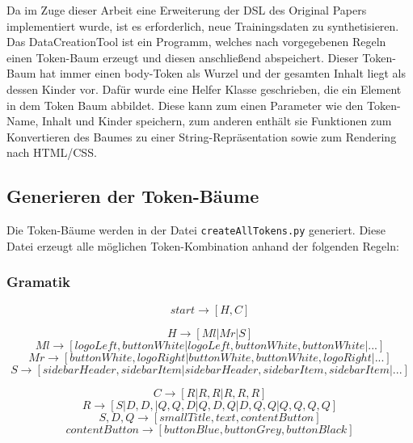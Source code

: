 \documentclass[pdftex,a4paper,halfparskip]{scrartcl}
\begin{document}
Da im Zuge dieser Arbeit eine Erweiterung der DSL des Original Papers implementiert wurde, ist es erforderlich, neue Trainingsdaten zu synthetisieren. Das DataCreationTool ist ein Programm, welches nach vorgegebenen Regeln einen Token-Baum erzeugt und diesen anschließend abspeichert. Dieser Token-Baum hat immer einen body-Token als Wurzel und der gesamten Inhalt liegt als dessen Kinder vor. Dafür wurde eine Helfer Klasse geschrieben, die ein Element in dem Token Baum abbildet. Diese kann zum einen Parameter wie den Token-Name, Inhalt und Kinder speichern, zum anderen enthält sie Funktionen zum Konvertieren des Baumes zu einer String-Repräsentation sowie zum Rendering nach HTML/CSS. 

\subsection{Generieren der Token-Bäume}
Die Token-Bäume werden in der Datei \texttt{createAllTokens.py} generiert. Diese Datei erzeugt alle möglichen Token-Kombination anhand der folgenden Regeln:

\subsubsection{Gramatik}

\begin{equation}
start \rightarrow [H,C]
\end{equation}

\begin{equation}
H \rightarrow [Ml | Mr | S]
\end{equation}
\begin{equation}
Ml \rightarrow  [ logoLeft, buttonWhite | logoLeft, buttonWhite, buttonWhite | ...]
\end{equation}
\begin{equation}
Mr \rightarrow [buttonWhite, logoRight | buttonWhite, buttonWhite, logoRight | ...]
\end{equation}
\begin{equation}
S \rightarrow [sidebarHeader, sidebarItem| sidebarHeader, sidebarItem, sidebarItem | ...]
\end{equation}

\begin{equation}
C \rightarrow [R | R, R | R, R, R ]
\end{equation}
\begin{equation}
R \rightarrow [S | D, D, | Q, Q, D | Q, D, Q | D, Q, Q | Q, Q, Q, Q]
\end{equation}
\begin{equation}
S, D, Q \rightarrow [smallTitle, text, contentButton]
\end{equation}
\begin{equation}
contentButton \rightarrow [buttonBlue, buttonGrey, buttonBlack]
\end{equation}
\end{document}
